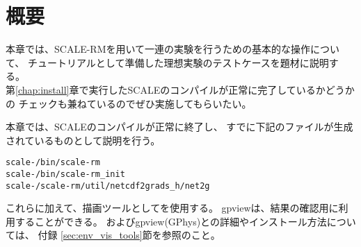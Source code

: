 \section{概要} \label{sec:ideal_exp_intro}

本章では、SCALE-RMを用いて一連の実験を行うための基本的な操作について、
チュートリアルとして準備した理想実験のテストケースを題材に説明する。\\
第\ref{chap:install}章で実行したSCALEのコンパイルが正常に完了しているかどうかの
チェックも兼ねているのでぜひ実施してもらいたい。

本章では、SCALEのコンパイルが正常に終了し、
すでに下記のファイルが生成されているものとして説明を行う。
\begin{alltt}
  scale-{\version}/bin/scale-rm
  scale-{\version}/bin/scale-rm_init
  scale-{\version}/scale-rm/util/netcdf2grads_h/net2g
\end{alltt}
これらに加えて、描画ツールとして\grads を使用する。
gpviewは、結果の確認用に利用することができる。
\grads およびgpview(GPhys)との詳細やインストール方法については、
付録 \ref{sec:env_vis_tools}節を参照のこと。




